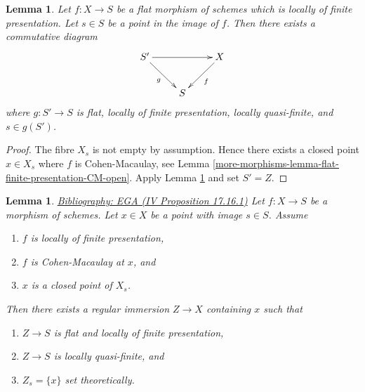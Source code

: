 \documentclass{amsart}
\newenvironment{reference}{\comment}{\endcomment}
\theoremstyle{plain}
\newtheorem{lemma}[subsection]{Lemma}
\theoremstyle{definition}
\theoremstyle{remark}
\numberwithin{equation}{subsection}
\begin{document}
\begin{lemma}
\label{more-morphisms-lemma-qf-fp-flat-neighbourhood-dominates-fppf}
Let $f : X \to S$ be a flat morphism of schemes which is
locally of finite presentation. Let $s \in S$ be a point in the image of $f$.
Then there exists a commutative diagram
$$
\xymatrix{
S' \ar[rr] \ar[rd]_g & & X \ar[ld]^f \\
& S
}
$$
where $g : S' \to S$ is flat, locally of finite presentation,
locally quasi-finite, and $s \in g(S')$.
\end{lemma}

\begin{proof}
The fibre $X_s$ is not empty by assumption. Hence there exists a closed
point $x \in X_s$ where $f$ is Cohen-Macaulay, see
Lemma \ref{more-morphisms-lemma-flat-finite-presentation-CM-open}.
Apply
Lemma \ref{more-morphisms-lemma-slice-CM}
and set $S' = Z$.
\end{proof}


\begin{lemma}
\label{more-morphisms-lemma-slice-CM}
\begin{reference}
\href{https://stacks.math.columbia.edu/bibliography}{Bibliography: EGA (IV Proposition 17.16.1)}
\end{reference}
Let $f : X \to S$ be a morphism of schemes.
Let $x \in X$ be a point with image $s \in S$.
Assume
\begin{enumerate}
\item $f$ is locally of finite presentation,
\item $f$ is Cohen-Macaulay at $x$, and
\item $x$ is a closed point of $X_s$.
\end{enumerate}
Then there exists a regular immersion $Z \to X$ containing $x$ such that
\begin{enumerate}
\item[(a)] $Z \to S$ is flat and locally of finite presentation,
\item[(b)] $Z \to S$ is locally quasi-finite, and
\item[(c)] $Z_s = \{x\}$ set theoretically.
\end{enumerate}
\end{lemma}
\end{document}
